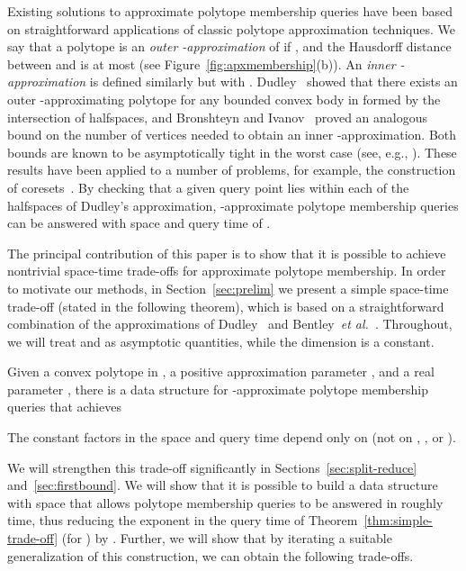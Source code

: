 \documentclass[11pt]{article}   \usepackage[letterpaper,hmargin=2.1cm,vmargin=3cm]{geometry}
\newcommand{\etal}{\textit{et al.}}
\begin{document}
Existing solutions to approximate polytope membership queries have been based on straightforward applications of classic polytope approximation techniques. We say that a polytope  is an \emph{outer -approximation} of  if , and the Hausdorff distance between  and  is at most  (see Figure~\ref{fig:apxmembership}(b)). An \emph{inner -approximation} is defined similarly but with . Dudley~\cite{Dudley} showed that there exists an outer -approximating polytope for any bounded convex body in  formed by the intersection of  halfspaces, and Bronshteyn and Ivanov~\cite{BrIv} proved an analogous bound on the number of vertices needed to obtain an inner -approximation. Both bounds are known to be asymptotically tight in the worst case (see, e.g., \cite{Bro08}). These results have been applied to a number of problems, for example, the construction of coresets~\cite{kernel-survey}. By checking that a given query point lies within each of the halfspaces of Dudley's approximation, -approximate polytope membership queries can be answered with space and query time of .

\medskip

The principal contribution of this paper is to show that it is possible to achieve nontrivial space-time trade-offs for approximate polytope membership. In order to motivate our methods, in Section~\ref{sec:prelim} we present a simple space-time trade-off (stated in the following theorem), which is based on a straightforward combination of the approximations of Dudley~\cite{Dudley} and Bentley~{\etal}~\cite{BFP}. Throughout, we will treat  and  as asymptotic quantities, while the dimension  is a constant.

\begin{theorem} \label{thm:simple-trade-off}
Given a convex polytope  in , a positive approximation parameter , and a real parameter , there is a data structure for -approximate polytope membership queries that achieves

The constant factors in the space and query time depend only on  (not on , , or ). 
\end{theorem}


We will strengthen this trade-off significantly in Sections~\ref{sec:split-reduce} and~\ref{sec:firstbound}. We will show that it is possible to build a data structure with  space that allows polytope membership queries to be answered in roughly  time, thus reducing the exponent in the query time of Theorem~\ref{thm:simple-trade-off} (for ) by . Further, we will show that by iterating a suitable generalization of this construction, we can obtain the following trade-offs.
\end{document}
